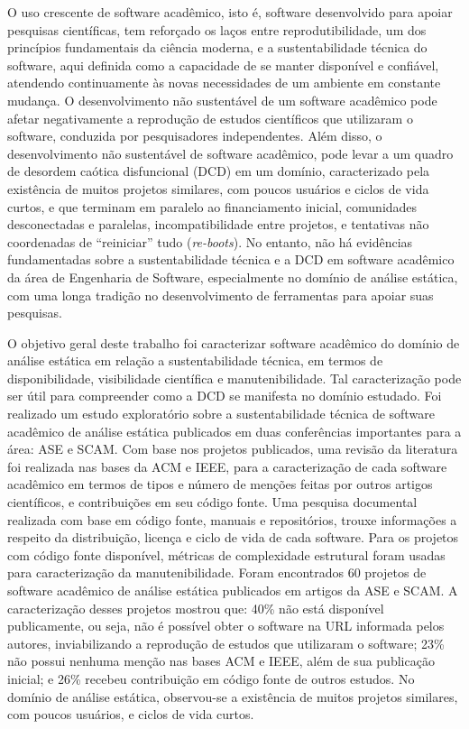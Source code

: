 O uso crescente de software acadêmico, isto é, 
software desenvolvido para apoiar pesquisas científicas,
tem reforçado os laços entre 
reprodutibilidade, um dos princípios fundamentais da ciência moderna,
e a sustentabilidade técnica do software,
aqui definida como a capacidade de se manter disponível e confiável,
atendendo continuamente às novas necessidades de um ambiente em constante mudança.
%
O desenvolvimento não sustentável de um software acadêmico pode 
afetar negativamente a reprodução de estudos científicos que utilizaram o software,
conduzida por pesquisadores independentes. 
Além disso, o desenvolvimento não sustentável de software acadêmico,
pode levar a um quadro de desordem caótica disfuncional (DCD) em um domínio,
caracterizado pela existência de muitos projetos similares, com poucos
usuários e ciclos de vida curtos, e que terminam em paralelo ao financiamento
inicial,  comunidades desconectadas e paralelas, incompatibilidade entre
projetos, e tentativas não coordenadas de ``reiniciar'' tudo
({\it re-boots}).
%
No entanto, não há evidências fundamentadas sobre a sustentabilidade técnica
e a DCD em software acadêmico da área de Engenharia de Software, especialmente
no domínio de análise estática, com uma longa tradição no
desenvolvimento de ferramentas para apoiar suas pesquisas.

O objetivo geral deste trabalho foi 
caracterizar software acadêmico do domínio de análise estática 
em relação a sustentabilidade técnica, 
em termos de disponibilidade, visibilidade científica e manutenibilidade.
Tal caracterização pode ser útil para compreender como a DCD se manifesta
no domínio estudado.
%
Foi realizado um estudo exploratório sobre a sustentabilidade
técnica de software acadêmico de análise estática 
publicados em duas conferências importantes para a área: ASE e SCAM.
%
Com base nos projetos publicados,  %
uma revisão da literatura foi realizada nas bases da ACM e IEEE, 
para a caracterização de cada software acadêmico 
em termos de tipos e número de menções feitas por outros artigos científicos,
e contribuições em seu código fonte.
Uma pesquisa documental realizada com base em 
código fonte, manuais e repositórios, trouxe informações a respeito da
distribuição, licença e ciclo de vida de cada software.
Para os projetos com código fonte disponível, métricas de
complexidade estrutural foram usadas para caracterização da manutenibilidade.
%
Foram encontrados 60 projetos de software acadêmico de análise estática
publicados em artigos da ASE e SCAM.
%
A caracterização desses projetos mostrou que: 
40\% não está disponível publicamente, ou seja, 
não é possível obter o software na URL informada pelos autores, 
inviabilizando a reprodução de estudos que utilizaram o software;
%
23\% não possui nenhuma menção nas bases ACM e IEEE, além de sua publicação inicial; e
26\% recebeu contribuição em código fonte de outros estudos.
No domínio de análise estática, observou-se a existência de muitos projetos similares, com poucos usuários, e ciclos de vida curtos.
%
